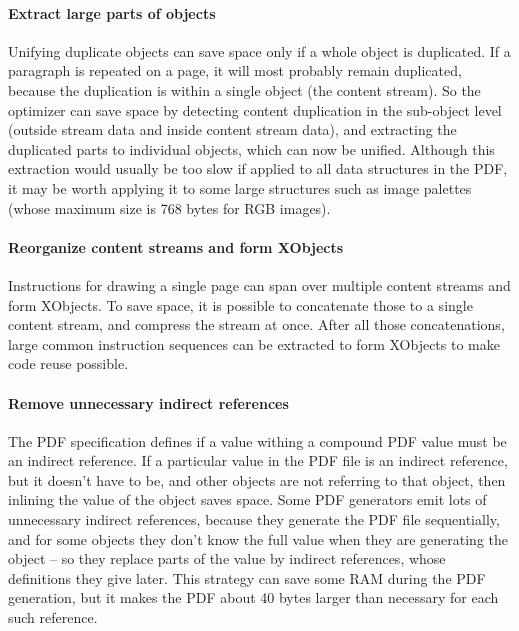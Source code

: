 \documentclass{ltugproc}
\begin{document}
\paragraph{Extract large parts of objects}

Unifying duplicate objects can save space only if a whole object is
duplicated. If a paragraph is repeated on a page, it will most probably
remain duplicated, because the duplication is within a single object (the
content stream). So the optimizer can save space by detecting content
duplication in the sub-object level (outside stream data and inside content
stream data), and extracting the duplicated parts to individual objects,
which can now be unified. Although this extraction would usually be too
slow if applied to all data structures in the PDF, it may be worth applying
it to some large structures such as image palettes (whose maximum size is
768 bytes for RGB images).

\paragraph{Reorganize content streams and form XObjects}

Instructions for drawing a single page can span over multiple content
streams and form XObjects. To save space, it is possible to concatenate
those to a single content stream, and compress the stream at once. After all
those concatenations, large common instruction sequences can be extracted
to form XObjects to make code reuse possible.

\paragraph{Remove unnecessary indirect references}

The PDF specification defines if a value withing a compound PDF value must
be an indirect reference. If a particular value in the PDF file is an
indirect reference, but it doesn't have to be, and other objects are not
referring to that object, then inlining the value of the object saves space.
Some PDF generators emit lots of unnecessary indirect references, because
they generate the PDF file sequentially, and for some objects they don't
know the full value when they are generating the object -- so they replace
parts of the value by indirect references, whose definitions they give
later. This strategy can save some RAM during the PDF generation, but it
makes the PDF about 40 bytes larger than necessary for each such reference.
\end{document}
